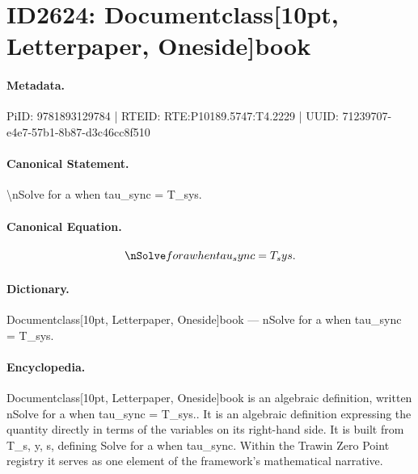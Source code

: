\section*{ID2624: Documentclass[10pt, Letterpaper, Oneside]book}
\paragraph{Metadata.}
PiID: 9781893129784 | RTEID: RTE:P10189.5747:T4.2229 | UUID: 71239707-e4e7-57b1-8b87-d3c46cc8f510

\paragraph{Canonical Statement.}
\textbackslash{}nSolve for a when tau\_sync = T\_sys.

\paragraph{Canonical Equation.}
\[
\nSolve for a when tau_sync = T_sys.
\]

\paragraph{Dictionary.}
Documentclass[10pt, Letterpaper, Oneside]book — nSolve for a when tau\_sync = T\_sys.

\paragraph{Encyclopedia.}
Documentclass[10pt, Letterpaper, Oneside]book is an algebraic definition, written nSolve for a when tau\_sync = T\_sys.. It is an algebraic definition expressing the quantity directly in terms of the variables on its right-hand side. It is built from T\_s, y, s, defining Solve for a when tau\_sync. Within the Trawin Zero Point registry it serves as one element of the framework's mathematical narrative.

